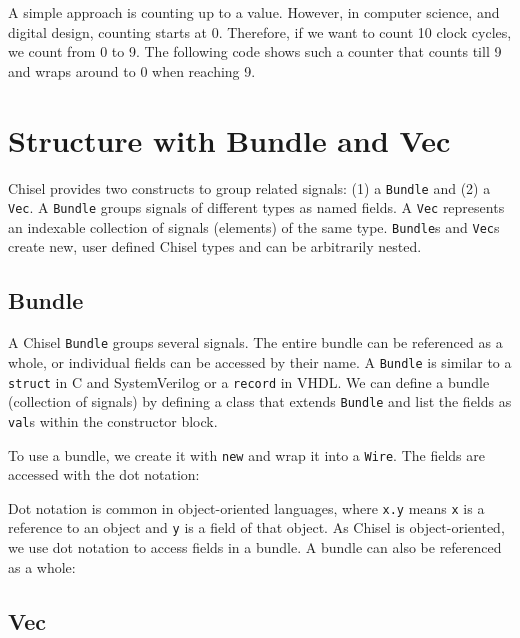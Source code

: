 \documentclass[%
    10pt,
    headinclude, footexclude,
    openright, %
    notitlepage,
    cleardoubleempty,
    headsepline,
    pointlessnumbers,
    bibtotoc, idxtotoc,
    ]{scrbook}
\newcommand{\code}[1]{{\small{\texttt{#1}}}}
\begin{document}
A simple approach is counting up to a value. However, in computer science,
and digital design, counting starts at 0. Therefore, if we want to count
10 clock cycles, we count from 0 to 9. The following code shows such a counter that counts
till 9 and wraps around to 0 when reaching 9.


\section{Structure with Bundle and Vec}


Chisel provides two constructs to group related signals: (1) a \code{Bundle} and (2) a \code{Vec}.
A \code{Bundle} groups signals of different types as named fields.
A \code{Vec} represents an indexable collection of signals (elements) of the same type.
\code{Bundle}s and \code{Vec}s create new, user defined Chisel types and can be arbitrarily nested.

\subsection{Bundle}

A Chisel \code{Bundle} groups several signals. The entire bundle can be referenced
as a whole, or individual fields can be accessed by their name.
A \code{Bundle} is similar to a \code{struct} in C and SystemVerilog or a \code{record} in VHDL.
We can define a bundle (collection of signals) by defining a class that
extends \code{Bundle} and list the fields as \code{val}s within the constructor block.


\noindent To use a bundle, we create it with \code{new} and wrap it into a \code{Wire}.
The fields are accessed with the dot notation:


Dot notation is common in object-oriented languages, where \code{x.y} means
\code{x} is a reference to an object and \code{y} is a field of that object.
As Chisel is object-oriented, we use dot notation to access fields in a bundle.
A bundle can also be referenced as a whole:


\subsection{Vec}
\end{document}

